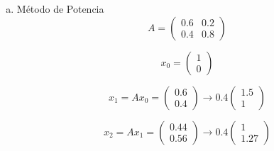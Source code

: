 \begin{frame}

	\begin{solution}
		\begin{enumerate}[d)]
			\item

			      Método de Potencia
			      \begin{equation*}
				      A=
				      \begin{pmatrix}
					      0.6 & 0.2 \\
					      0.4 & 0.8
				      \end{pmatrix}
			      \end{equation*}

			      \begin{equation*}
				      x_{0}=
				      \begin{pmatrix}
					      1 \\
					      0
				      \end{pmatrix}
			      \end{equation*}

			      \begin{equation*}
				      x_{1}=
				      Ax_{0}=
				      \begin{pmatrix}
					      0.6 \\
					      0.4
				      \end{pmatrix}\to
				      0.4
				      \begin{pmatrix}
					      1.5 \\
					      1
				      \end{pmatrix}
			      \end{equation*}

			      \begin{equation*}
				      x_{2}=
				      Ax_{1}=
				      \begin{pmatrix}
					      0.44 \\
					      0.56
				      \end{pmatrix}\to
				      0.4
				      \begin{pmatrix}
					      1 \\
					      1.27
				      \end{pmatrix}
			      \end{equation*}


\end{enumerate}
\end{solution}
\end{frame}
